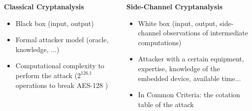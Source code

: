 \begin{frame}
\begin{columns}
\begin{column}{.5\textwidth}
\textbf{Classical Cryptanalysis}
\begin{itemize}
\item Black box (input, output)
\item Formal attacker model (oracle, knowledge, ...)
\item Computational complexity to perform the attack (\eg $2^{126.1}$ operations to break AES-128 \cite{bogdanov})
\end{itemize}
\end{column}
\begin{column}{.5\textwidth}
\textbf{Side-Channel Cryptanalysis}
\begin{itemize}
\item White box (input, output, side-channel observations of intermediate computations)
\item Attacker with a certain equipment, expertise, knowledge of the embedded device, available time...
\item In Common Criteria: the cotation table of the attack
\end{itemize}
\end{column}
\end{columns}

\end{frame}

